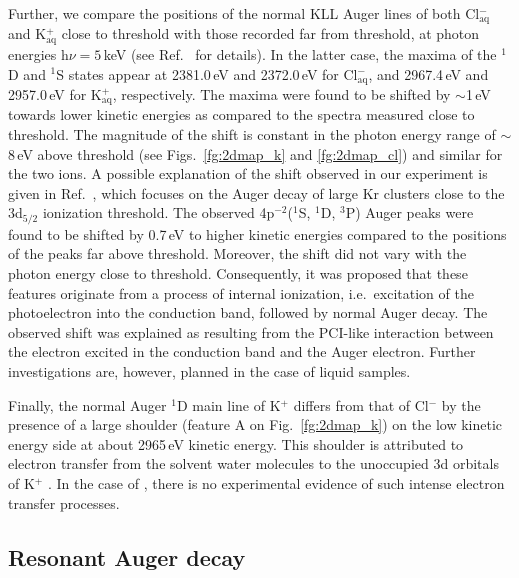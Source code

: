 Further, we compare the positions of the normal KLL Auger lines of both Cl$^{-}_{\text{aq}}$ and K$^{+}_{\text{aq}}$ close to threshold with those recorded far from threshold, at photon energies h$\nu = 5$\,keV (see Ref.\ \citep{ceolin17:263003} for details). In the latter case, the maxima of the $^1$D and $^1$S states appear at 2381.0\,eV and 2372.0\,eV for Cl$^{-}_{\text{aq}}$, and 2967.4\,eV and 2957.0\,eV for K$^{+}_{\text{aq}}$, respectively. The maxima were found to be shifted by $\sim$1\,eV towards lower kinetic energies as compared to the spectra measured close to threshold. The magnitude of the shift is constant in the photon energy range of $\sim$8\,eV above threshold (see Figs.\ \ref{fg:2dmap_k} and \ref{fg:2dmap_cl}) and similar for the two ions. %
A possible explanation of the shift observed in our experiment is given in Ref.\ \cite{tchaplyguine07:124314}, which focuses on the Auger decay of large Kr clusters close to the 3d$_{5/2}$ ionization threshold. The observed 4p$^{-2}$($^1$S, $^1$D, $^3$P) Auger peaks were found to be shifted by 0.7\,eV to higher kinetic energies compared to the positions of the peaks far above threshold. Moreover, the shift did not vary with the photon energy close to threshold. Consequently, it was proposed that these features originate from a process of internal ionization, i.e.\ excitation of the photoelectron into the conduction band, followed by normal Auger decay. The observed shift was explained as resulting from the PCI-like interaction between the electron excited in the conduction band and the Auger electron. Further investigations are, however, planned in the case of liquid samples.


Finally, the normal Auger $^1$D main line of K$^{+}$ differs from that of Cl$^{-}$ by the presence of a large shoulder (feature A on Fig.\ \ref{fg:2dmap_k}) on the low kinetic energy side at about 2965\,eV kinetic energy. This shoulder is attributed to electron transfer from the solvent water molecules to the unoccupied 3d orbitals of K$^{+}$ \citep{ceolin17:263003}. In the case of \cli, there is no experimental evidence of such intense electron transfer processes.


\subsection{Resonant Auger decay} \label{ssec:ra}


